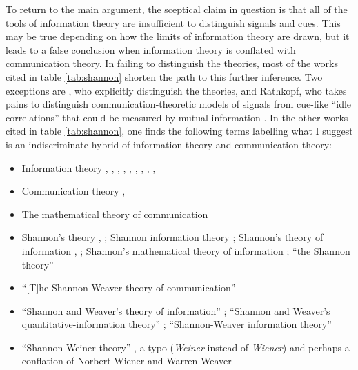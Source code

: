 To return to the main argument, the sceptical claim in question is that all of the tools of information theory are insufficient to distinguish signals and cues.
This may be true depending on how the limits of information theory are drawn, but it leads to a false conclusion when information theory is conflated with communication theory.
In failing to distinguish the theories, most of the works cited in table \ref{tab:shannon} shorten the path to this further inference.
Two exceptions are \citet[17-20]{piccinini2011information}, who explicitly distinguish the theories, and Rathkopf, who takes pains to distinguish communication-theoretic models of signals from cue-like ``idle correlations'' that could be measured by mutual information \citep[p. 324 passim]{rathkopf2017neural}.
In the other works cited in table \ref{tab:shannon}, one finds the following terms labelling what I suggest is an indiscriminate hybrid of information theory and communication theory:

\begin{itemize}
    \item Information theory \citep[p. 3 passim]{adriaans2019information}, \citep[12]{shea2018representation}, \citep[614]{timpson2006grammar}, \citep[2]{baker2021natural}, \citep[3]{kirchhoff2021universal}, \citep[109]{dennett2017bacteria}, \citep[1]{isaac2018semantics}, \citep[8]{godfrey-smith2016biological}, \citep[p. 777 as ``this formal information theory'']{owren2010redefining}, \citep[p. 1991 as ``the theory of information'']{lombardi2015shannon}
    \item Communication theory \citep[592]{timpson2006grammar}, \citep[1987]{lombardi2015shannon}
    \item The mathematical theory of communication \citep[1988]{lombardi2015shannon}
    \item Shannon's theory \citep[2]{isaac2018semantics}, \citep[1984]{lombardi2015shannon}; Shannon information theory \citep[400]{lean2014shannon}; Shannon's theory of information \citep[p. 78, n. 5]{shea2018representation}, \citep[6]{isaac2018semantics}; Shannon's mathematical theory of information \citep[5, 106]{dennett2017bacteria}; ``the Shannon theory'' \citep[p. 599 n. 15]{timpson2006grammar}
    \item ``[T]he Shannon-Weaver theory of communication'' \citep[p. 756 n. 3]{owren2010redefining}
    \item ``Shannon and Weaver's \parencite*{shannon1949mathematical} theory of information'' \citep[759]{owren2010redefining}; ``Shannon and Weaver's quantitative-information theory'' \citep[761]{owren2010redefining}; ``Shannon-Weaver information theory'' \citep[344]{dennett1983intentional}
    \item ``Shannon-Weiner theory'' \citep[19]{baker2021natural}, a typo (\textit{Weiner} instead of \textit{Wiener}) and perhaps a conflation of Norbert Wiener and Warren Weaver
\end{itemize}

